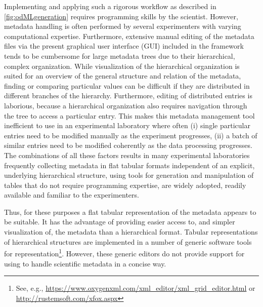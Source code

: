 Implementing and applying such a rigorous workflow as described in \cref{fig:odMLgeneration} requires programming skills by the scientist. However, metadata handling is often performed by several experimenters with varying computational expertise. Furthermore, extensive manual editing of the metadata files via the present graphical user interface (GUI) included in the  framework tends to be cumbersome for large metadata trees due to their hierarchical, complex organization. While visualization of the hierarchical organization is suited for an overview of the general structure and relation of the metadata, finding or comparing particular values can be difficult if they are distributed in different branches of the hierarchy. Furthermore, editing of distributed entries is laborious, because a hierarchical organization also requires navigation through the tree to access a particular entry. This makes this metadata management tool inefficient to use in an experimental laboratory where often (i) single particular entries need to be modified manually as the experiment progresses, (ii) a batch of similar entries need to be modified coherently as the data processing progresses. The combinations of all these factors results in many experimental laboratories frequently collecting metadata in flat tabular formats independent of an explicit, underlying hierarchical structure, using tools for generation and manipulation of tables that do not require programming expertise, are widely adopted, readily available and familiar to the experimenters.

Thus, for these purposes a flat tabular representation of the metadata appears to be suitable. It has the advantage of providing easier access to, and simpler visualization of, the metadata than a hierarchical format. Tabular representations of hierarchical structures are implemented in a number of generic software tools for  representation\footnote{See, e.g., \url{https://www.oxygenxml.com/xml\_editor/xml\_grid\_editor.html} or \url{http://rustemsoft.com/xfox.aspx}}. However, these generic  editors do not provide support for using  to handle scientific metadata in a concise way.

